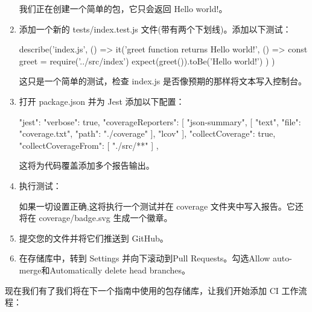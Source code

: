 \begin{enumerate}
我们正在创建一个简单的包，它只会返回 Hello world!。

\item 
添加一个新的 tests/index.test.js 文件(带有两个下划线)。添加以下测试：

\begin{shell}
describe('index.js', () => {
  it('greet function returns Hello world!', () => {
    const greet = require('../src/index')
    expect(greet()).toBe('Hello world!')
  })
})
\end{shell}

这只是一个简单的测试，检查 index.js 是否像预期的那样将文本写入控制台。

\item 
打开 package.json 并为 Jest 添加以下配置：

\begin{shell}
"jest": {
  "verbose": true,
  "coverageReporters": [
    "json-summary",
    [
      "text",
      {
        "file": "coverage.txt",
        "path": "./coverage"
      }
    ],
    "lcov"
  ],
  "collectCoverage": true,
  "collectCoverageFrom": [
    "./src/**"
  ]
},
\end{shell}

这将为代码覆盖添加多个报告输出。

\item 
执行测试： 


如果一切设置正确,这将执行一个测试并在 coverage 文件夹中写入报告。它还将在 coverage/badge.svg 生成一个徽章。

\item 
提交您的文件并将它们推送到 GitHub。

\item 
在存储库中，转到 Settings 并向下滚动到Pull Requests。勾选Allow auto-merge和Automatically delete head branches。
\end{enumerate}


现在我们有了我们将在下一个指南中使用的包存储库，让我们开始添加 CI 工作流程：

